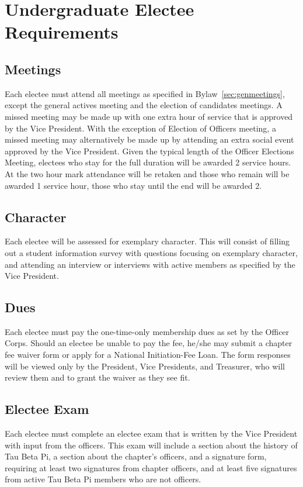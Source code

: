 \chapter{Undergraduate Electee Requirements}\label{sec:ugradreqs}
\section{Meetings} Each electee must attend all meetings as specified in Bylaw~\ref{sec:genmeetings}, except the general actives meeting and the election of candidates  meetings. A missed meeting may be made up with one extra hour of service that is approved by the Vice President. 
With the exception of Election of Officers meeting, a missed meeting may alternatively be made up by attending an extra social event approved by the Vice President. Given the typical length of the Officer Elections Meeting, electees who stay for the full duration will be awarded 2 service hours. At the two hour mark attendance will be retaken and those who remain will be awarded 1 service hour, those who stay until the end will be awarded 2.
\section{Character} Each electee will be assessed for exemplary character. This will consist of filling out a student information survey with questions focusing on exemplary character, and attending  an interview or interviews with active members as specified by the Vice President. %
\section{Dues} Each electee must pay the one-time-only membership dues as set by the Officer Corps. Should an electee be unable to pay the fee, he/she may submit a chapter fee waiver form or apply for a National Initiation-Fee Loan. The form responses will be viewed only by the President, Vice Presidents, and Treasurer, who will review them and to grant the waiver as they see fit.
\section{Electee Exam} Each electee must complete an electee exam that is written by the Vice President with input from the officers. This exam will include a section about the history of Tau Beta Pi, a section about the chapter's officers, and a signature form, requiring at least two signatures from chapter officers, and at least five signatures from active Tau Beta Pi members who are not officers.
